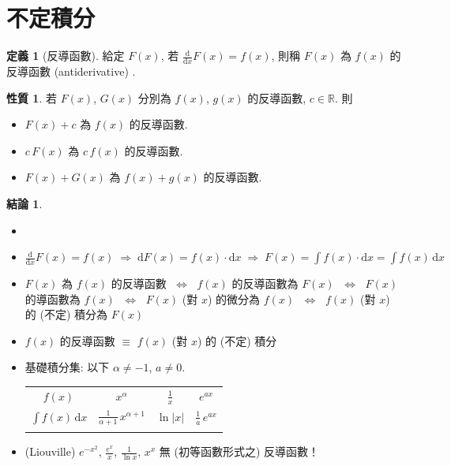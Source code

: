 \documentclass[12pt]{extarticle}
\newcommand{\ds}{\displaystyle}
\newcommand{\ie}{\;\Longrightarrow\;}
\newcommand{\ifff}{\;\Longleftrightarrow\;}
\theoremstyle{definition}
\newtheorem*{dfn}{定義}
\newtheorem*{prp}{性質}
\newtheorem*{fact}{結論}
\begin{document}
\section*{不定積分}

\begin{dfn}[反導函數]
  給定 $\ds F(x)$, 若 $\ds\frac{\text{d}}{\text{d}x} F(x) = f(x)$, 則稱 $F(x)$ 為 $f(x)$ 的反導函數 (antiderivative) .  
\end{dfn}

\begin{prp}若 $\ds F(x)$, $\ds G(x)$ 分別為 $f(x)$, $g(x)$ 的反導函數, $c\in\mathbb{R}$. 則
  \begin{itemize}\setlength{\itemsep}{0pt}
    \item $\ds F(x) + c$ 為 $f(x)$ 的反導函數. 
    \item $\ds c\,F(x)$ 為 $c\,f(x)$ 的反導函數. 
    \item $\ds F(x) + G(x)$ 為 $f(x) + g(x)$ 的反導函數. 
  \end{itemize}
\end{prp}

\begin{fact}
  \begin{itemize}\setlength{\itemsep}{0pt}
    \item[]
    \item $\ds\frac{\text{d}}{\text{d}x} F(x) = f(x)\ie \text{d} F(x) = f(x)\cdot\text{d}x \ie F(x) = \int f(x)\cdot\text{d}x = \int f(x)\,\text{d}x$
    \item $F(x)$ 為 $f(x)$ 的反導函數 $\ifff$ $f(x)$ 的反導函數為 $F(x)$ $\ifff$ $F(x)$ 的導函數為 $f(x)$ $\ifff$ $F(x)$ (對 $x$) 的微分為 $f(x)$ $\ifff$ $f(x)$ (對 $x$) 的 (不定) 積分為 $F(x)$ 
    \item $f(x)$ 的反導函數 $\equiv$ $f(x)$ (對 $x$) 的 (不定) 積分
    \item 基礎積分集: 以下 $\ds\alpha\ne -1$, $a\ne 0$. 
      \begin{table}[!htbp]
        \centering
        \begin{tabular}{c|ccc}
          \toprule
          \addlinespace[2mm]
          $\ds f(x)$ & $\ds x^\alpha$ & $\ds\frac{1}{x}$ & $\ds e^{a x}$  \\
          \addlinespace[2mm]
          \midrule
          \addlinespace[2mm]
          $\ds \int f(x)\,\text{d}x$ & $\ds\frac{1}{\alpha + 1}\,x^{\alpha + 1}$ & $\ds\ln |x|$ & $\ds\frac{1}{a}\,e^{a x}$ \\
          \addlinespace[2mm]
          \bottomrule
        \end{tabular}
      \end{table}
    \item (Liouville) {\color{M4} $\ds e^{-x^2}$, $\ds\frac{e^x}{x}$, $\ds\frac{1}{\ln x}$, $\ds x^x$ 無 (初等函數形式之) 反導函數！}
  \end{itemize}
\end{fact}
\end{document}
